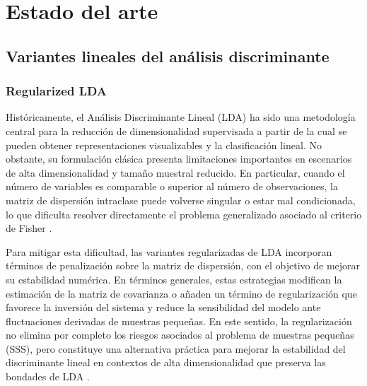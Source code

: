 
\chapter{Estado del arte}
\label{chap:Estado_Arte}

\section{Variantes lineales del análisis discriminante}

\subsection{Regularized LDA}

Históricamente, el Análisis Discriminante Lineal (LDA) ha sido una metodología central para la reducción de dimensionalidad supervisada a partir de la cual se pueden obtener representaciones visualizables y la clasificación lineal. No obstante, su formulación clásica presenta limitaciones importantes en escenarios de alta dimensionalidad y tamaño muestral reducido. En particular, cuando el número de variables es comparable o superior al número de observaciones, la matriz de dispersión intraclase puede volverse singular o estar mal condicionada, lo que dificulta resolver directamente el problema generalizado asociado al criterio de Fisher \cite{yang2023efficient}.

Para mitigar esta dificultad, las variantes regularizadas de LDA incorporan términos de penalización sobre la matriz de dispersión, con el objetivo de mejorar su estabilidad numérica. En términos generales, estas estrategias modifican la estimación de la matriz de covarianza o añaden un término de regularización que favorece la inversión del sistema y reduce la sensibilidad del modelo ante fluctuaciones derivadas de muestras pequeñas. En este sentido, la regularización no elimina por completo los riesgos asociados al problema de muestras pequeñas (SSS), pero constituye una alternativa práctica para mejorar la estabilidad del discriminante lineal en  contextos de alta dimensionalidad que preserva las bondades de LDA \cite{Araveeporn2023}.

